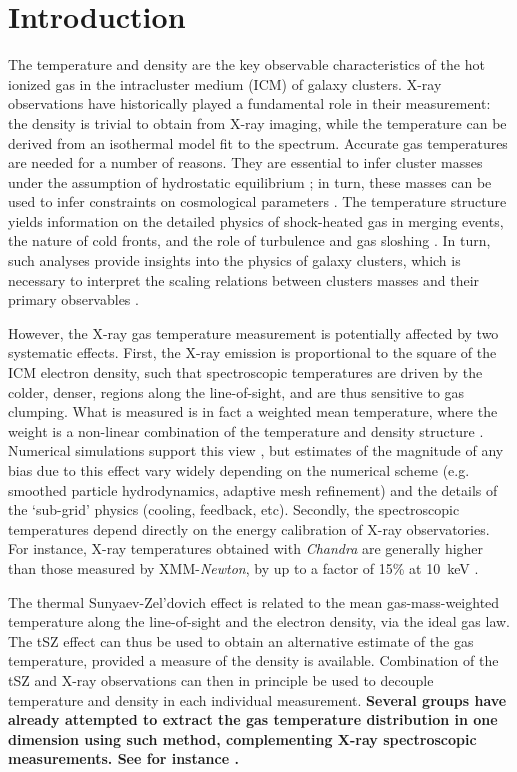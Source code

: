 \documentclass[twocolumn,traditabstract]{aa}
\begin{document}
\section{Introduction}\label{sec:Introduction}
The temperature and density are the key observable characteristics of the hot ionized gas in the intracluster medium (ICM) of galaxy clusters. X-ray observations have historically played a fundamental role in their measurement: the density is trivial to obtain from X-ray imaging, while the temperature can be derived from an isothermal model fit to the spectrum. Accurate gas temperatures are needed for a number of reasons. They are essential to infer cluster masses under the assumption of hydrostatic equilibrium \citep{Sarazin1988}; in turn, these masses can be used to infer constraints on cosmological parameters \citep[e.g.,][]{Allen2011}. The temperature structure yields information on the detailed physics of shock-heated gas in merging events, the nature of cold fronts, and the role of turbulence and gas sloshing \citep[see e.g.][for a review]{mar07}. In turn, such analyses provide insights into the physics of galaxy clusters, which is necessary to interpret the scaling relations between clusters masses and their primary observables \citep{Khedekar2013}.

However, the X-ray gas temperature measurement is potentially affected by two systematic effects. First, the X-ray emission is proportional to the square of the ICM electron density, such that spectroscopic temperatures are driven by the colder,  denser, regions along the line-of-sight, and are thus sensitive to gas clumping. What is measured is in fact a weighted mean temperature, where the weight is a non-linear combination of the temperature and density structure \citep[see e.g.][]{maz04,vik06b}. Numerical simulations support this view \citep[e.g.][]{Nagai2007,ras14}, but estimates of the magnitude of any bias due to this effect vary widely depending on the numerical scheme (e.g. smoothed particle hydrodynamics, adaptive mesh refinement) and the details  of the `sub-grid' physics (cooling, feedback, etc). Secondly, the spectroscopic temperatures depend directly on the energy calibration of X-ray observatories. For instance, X-ray temperatures obtained with \textit{Chandra} are generally higher than those measured by XMM-\textit{Newton}, by up to a factor of 15\% at 10~keV \citep[e.g.,][]{Mahdavi2013}.

The thermal Sunyaev-Zel'dovich \citep[tSZ,][]{Sunyaev1972} effect is related to the mean gas-mass-weighted temperature along the line-of-sight and the electron density, via the ideal gas law. The tSZ effect can thus be used to obtain an alternative estimate of the gas temperature, provided a measure of the density is available. Combination of the tSZ and X-ray observations can then in principle be used to decouple temperature and density in each individual measurement. {\bf Several groups have already attempted to extract the gas temperature distribution in one dimension using such method, complementing X-ray spectroscopic measurements. See for instance \cite{Nord2009,Basu2010,Eckert2013,Ruppin2016}.}
\end{document}
